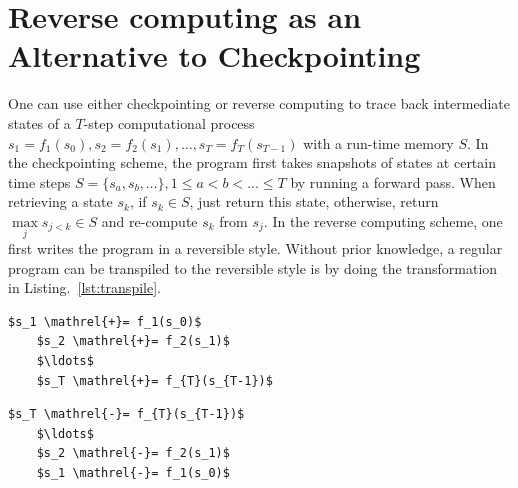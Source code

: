 \documentclass{article}
\newcommand{\<}{\langle}
\renewcommand{\>}{\rangle}
\newcommand{\Lst}[1]{Listing.~\ref{#1}}
\theoremstyle{definition}\newtheorem{definition}{\textit{Definition}}
\begin{document}
\section{Reverse computing as an Alternative to Checkpointing}\label{sec:timespace}

One can use either checkpointing or reverse computing to trace back intermediate states of a $T$-step computational process $s_1 = f_1(s_0), s_2=f_2(s_1), \ldots, s_T = f_T(s_{T-1})$ with a run-time memory $S$. In the checkpointing scheme, the program first takes snapshots of states at certain time steps $S = \{s_{a}, s_b, \ldots\}, 1\leq a < b < ... \leq T$ by running a forward pass. When retrieving a state $s_k$, if $s_k \in S$, just return this state, otherwise, return $\max\limits_j s_{j<k} \in S$ and re-compute $s_k$ from $s_j$.
In the reverse computing scheme, one first writes the program in a reversible style.
Without prior knowledge, a regular program can be transpiled to the reversible style is by doing the transformation in \Lst{lst:transpile}.

\begin{minipage}{.45\columnwidth}
\begin{lstlisting}[mathescape=true,caption={Transpiling a regular code to the reversible code without prior knowledge.}, label={lst:transpile}]
    $s_1 \mathrel{+}= f_1(s_0)$
    $s_2 \mathrel{+}= f_2(s_1)$
    $\ldots$
    $s_T \mathrel{+}= f_{T}(s_{T-1})$
\end{lstlisting}
\end{minipage}
\begin{minipage}{.45\columnwidth}
    \begin{lstlisting}[mathescape=true,caption={The reverse of \Lst{lst:transpile}}, label={lst:transpile-rev}]
    $s_T \mathrel{-}= f_{T}(s_{T-1})$
    $\ldots$
    $s_2 \mathrel{-}= f_2(s_1)$
    $s_1 \mathrel{-}= f_1(s_0)$
\end{lstlisting}
\end{minipage}
\end{document}
